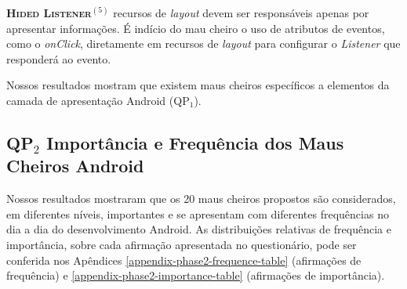   \noindent
  \textbf{\textsc{{\small Hided Listener}}}$^{(5)}$
      recursos de \textit{layout} devem ser responsáveis apenas por apresentar informações. É indício do mau cheiro o uso de atributos de eventos, como o \textit{onClick}, diretamente em recursos de \textit{layout} para configurar o \textit{Listener} que responderá ao evento. \\



\begin{square}
  \small
  Nossos resultados mostram que existem maus cheiros específicos a elementos da camada de apresentação Android (QP$_1$).
\end{square}














\subsection{QP$_2$ Importância e Frequência dos Maus Cheiros Android}
\label{phase2-results}


Nossos resultados mostraram que os 20 maus cheiros propostos são considerados, em diferentes níveis, importantes e se apresentam com diferentes frequências no dia a dia do desenvolvimento Android. As distribuições relativas de frequência e importância, sobre cada afirmação apresentada no questionário, pode ser conferida nos Apêndices \ref{appendix-phase2-frequence-table} (afirmações de frequência) e \ref{appendix-phase2-importance-table} (afirmações de importância).

